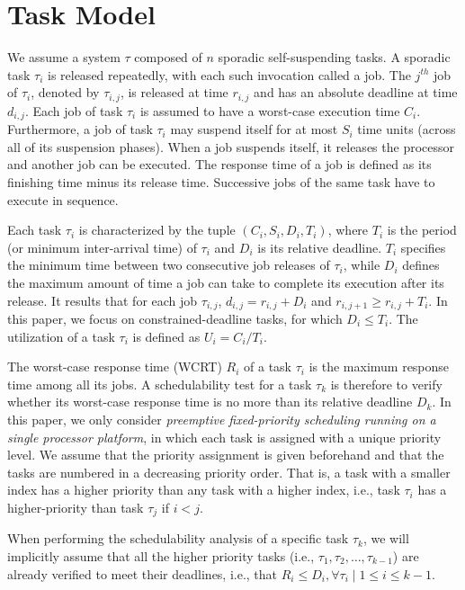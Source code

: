 \section{Task Model}


We assume a system $\tau$ composed of $n$ sporadic self-suspending tasks. A sporadic task $\tau_i$ is released repeatedly, with each such invocation called a
job. The $j^{th}$ job of $\tau_i$, denoted by $\tau_{i,j}$, is released
at time $r_{i,j}$ and has an absolute deadline at time $d_{i,j}$. Each
job of task $\tau_i$ is assumed to have a worst-case execution time $C_i$. Furthermore, a job of task $\tau_i$ may suspend itself for at most $S_i$ time units (across all of its suspension phases). When a job suspends itself, it releases the processor and another job can be executed. The response time of a job is defined as its finishing time minus its release
time. Successive jobs of the same task have to execute in
sequence. 

Each task $\tau_i$ is characterized by the tuple $(C_i, S_i, D_i, T_i)$, where $T_i$ is the period (or minimum inter-arrival time) of $\tau_i$ and $D_i$ is its relative deadline. $T_i$ specifies the minimum time between two consecutive job releases of
$\tau_i$, while $D_i$ defines the maximum
amount of time a job can take to complete its execution after its
release. It results that for each job $\tau_{i,j}$, $d_{i,j}=r_{i,j}+D_i$ and $r_{i,j+1} \geq r_{i,j} + T_i$. In this paper, we focus on constrained-deadline tasks, for which
$D_i \leq T_i$. The utilization of a task $\tau_i$ is defined as $U_i=C_i/T_i$. 

The worst-case response time (WCRT) $R_i$ of a task $\tau_i$ is the maximum response time among all its
jobs. A schedulability test for a task $\tau_k$
is therefore to verify whether its worst-case response time is no more than its relative deadline $D_k$.
In this paper, we only consider \emph{preemptive fixed-priority scheduling running on a single processor platform}, in
which each task is assigned with a unique priority level. We assume
that the priority assignment is given beforehand and that the tasks are numbered in a decreasing priority order. That is, a task with a smaller index has a higher priority than any task with a higher index, i.e., task $\tau_i$ has a higher-priority than task $\tau_{j}$ if $i < j$. 

When performing the schedulability analysis of a specific task $\tau_k$, we will implicitly assume that all the higher priority tasks (i.e., $\tau_1, \tau_2, \ldots, \tau_{k-1}$) are already verified to meet their deadlines, i.e., that $R_i \leq D_i, \forall \tau_i \mid 1 \leq i \leq k-1$. 




